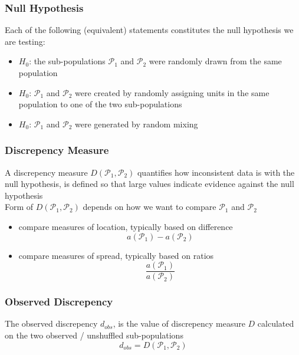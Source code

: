 \documentclass[11pt]{article}
\begin{document}
\subsubsection*{Null Hypothesis}
Each of the following (equivalent) statements constitutes the null hypothesis we are testing:
\begin{itemize}
    \item $H_0$: the sub-populations $\mathcal{P}_1$ and $\mathcal{P}_2$ were randomly drawn from the same population 
    \item $H_0$: $\mathcal{P}_1$ and $\mathcal{P}_2$ were created by randomly assigning units in the same population to one of the two sub-populations 
    \item $H_0$: $\mathcal{P}_1$ and $\mathcal{P}_2$ were generated by random mixing 
\end{itemize}
\subsubsection*{Discrepency Measure}
A discrepency measure $D(\mathcal{P}_1, \mathcal{P}_2)$ quantifies how inconsistent data is with the null hypothesis, is defined so that large values indicate evidence against the null hypothesis \\
Form of $D(\mathcal{P}_1, \mathcal{P}_2)$ depends on how we want to compare $\mathcal{P}_1$ and $\mathcal{P}_2$ 
\begin{itemize}
    \item compare measures of location, typically based on difference \[a(\mathcal{P}_1) - a(\mathcal{P}_2)\]
    \item compare measures of spread, typically based on ratios \[\frac{a(\mathcal{P}_1)}{a(\mathcal{P}_2)}\]
\end{itemize}
\subsubsection*{Observed Discrepency}
The observed discrepency $d_{obs}$, is the value of discrepency measure $D$ calculated on the two observed / unshuffled sub-populations 
\[d_{obs} = D(\mathcal{P}_1, \mathcal{P}_2)\]
\end{document}
